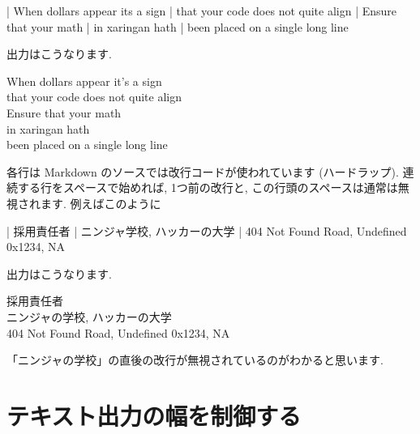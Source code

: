 \documentclass[
  11pt,
]{bxjsreport}
\newenvironment{Shaded}{\begin{snugshade}}{\end{snugshade}}
\newcommand{\NormalTok}[1]{#1}
\renewenvironment{quote}{\begin{VF}}{\end{VF}}
\renewenvironment{quote}{\def\FrameCommand{{\color{quotebarcolor}{\vrule width 3pt}}\hspace{10pt}}\MakeFramed{\advance\hsize-\width\FrameRestore}}{\endMakeFramed}
\begin{document}
\begin{Shaded}
\begin{Highlighting}[]
\NormalTok{| When dollars appear it\textquotesingle{}s a sign}
\NormalTok{|   that your code does not quite align  }
\NormalTok{| Ensure that your math  }
\NormalTok{|   in xaringan hath  }
\NormalTok{|   been placed on a single long line}
\end{Highlighting}
\end{Shaded}

出力はこうなります.

\begin{quote}
When dollars appear it's a sign\\
\hspace*{0.333em}\hspace*{0.333em}that your code does not quite align\\
Ensure that your math\\
\hspace*{0.333em}\hspace*{0.333em}in xaringan hath\\
\hspace*{0.333em}\hspace*{0.333em}been placed on a single long line
\end{quote}

各行は Markdown のソースでは改行コードが使われています (ハードラップ). 連続する行をスペースで始めれば, 1つ前の改行と, この行頭のスペースは通常は無視されます. 例えばこのように

\begin{Shaded}
\begin{Highlighting}[]
\NormalTok{| 採用責任者}
\NormalTok{| ニンジャ学校,}
\NormalTok{  ハッカーの大学}
\NormalTok{| 404 Not Found Road,}
\NormalTok{  Undefined 0x1234, NA}
\end{Highlighting}
\end{Shaded}

出力はこうなります.

\begin{quote}
採用責任者\\
ニンジャの学校, ハッカーの大学\\
404 Not Found Road, Undefined 0x1234, NA
\end{quote}

「ニンジャの学校」の直後の改行が無視されているのがわかると思います.

\hypertarget{text-width}{%
\section{テキスト出力の幅を制御する}\label{text-width}}
\end{document}

